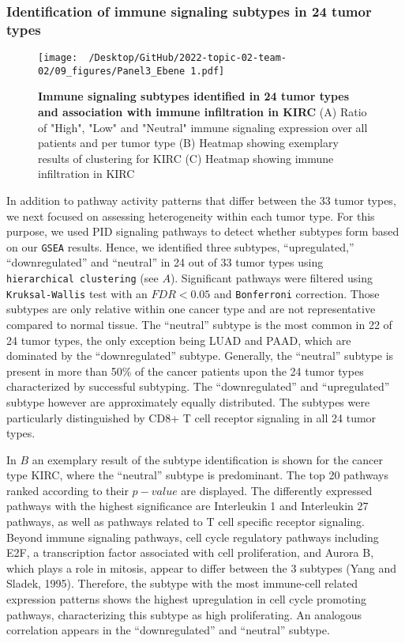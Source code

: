 \documentclass[
  parskip,
  oneside]{\documentclass[oneside]{book}}
\begin{document}
\hypertarget{identification-of-immune-signaling-subtypes-in-24-tumor-types}{%
\subsubsection{Identification of immune signaling subtypes in 24 tumor
types}\label{identification-of-immune-signaling-subtypes-in-24-tumor-types}}

\begin{figure}[h]
  \texttt{[image: ~/Desktop/GitHub/2022-topic-02-team-02/09\_figures/Panel3\_Ebene 1.pdf]}
  \caption{\textbf{Immune signaling subtypes identified in 24 tumor types and association with immune infiltration in KIRC} (A) Ratio of "High", "Low" and "Neutral" immune signaling expression over all patients and per tumor type (B) Heatmap showing exemplary results of clustering for KIRC (C) Heatmap showing immune infiltration in KIRC}
  \label{pengplot}
\end{figure}

In addition to pathway activity patterns that differ between the 33
tumor types, we next focused on assessing heterogeneity within each
tumor type. For this purpose, we used PID signaling pathways to detect
whether subtypes form based on our \texttt{GSEA} results. Hence, we
identified three subtypes, ``upregulated,'' ``downregulated'' and
``neutral'' in 24 out of 33 tumor types using
\texttt{hierarchical\ clustering} (see  \(A\)).
Significant pathways were filtered using \texttt{Kruksal-Wallis} test
with an \(FDR < 0.05\) and \texttt{Bonferroni} correction. Those
subtypes are only relative within one cancer type and are not
representative compared to normal tissue. The ``neutral'' subtype is the
most common in 22 of 24 tumor types, the only exception being LUAD and
PAAD, which are dominated by the ``downregulated'' subtype. Generally,
the ``neutral'' subtype is present in more than 50\% of the cancer
patients upon the 24 tumor types characterized by successful subtyping.
The ``downregulated'' and ``upregulated'' subtype however are
approximately equally distributed. The subtypes were particularly
distinguished by CD8+ T cell receptor signaling in all 24 tumor types.

In  \(B\) an exemplary result of the subtype
identification is shown for the cancer type KIRC, where the ``neutral''
subtype is predominant. The top 20 pathways ranked according to their
\(p-value\) are displayed. The differently expressed pathways with the
highest significance are Interleukin 1 and Interleukin 27 pathways, as
well as pathways related to T cell specific receptor signaling. Beyond
immune signaling pathways, cell cycle regulatory pathways including E2F,
a transcription factor associated with cell proliferation, and Aurora B,
which plays a role in mitosis, appear to differ between the 3 subtypes
(Yang and Sladek, 1995). Therefore, the subtype with the most
immune-cell related expression patterns shows the highest upregulation
in cell cycle promoting pathways, characterizing this subtype as high
proliferating. An analogous correlation appears in the ``downregulated''
and ``neutral'' subtype.
\end{document}
